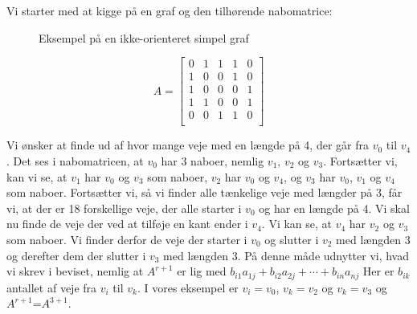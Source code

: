 \begin{exmp}
Vi starter med at kigge på en graf og den tilhørende nabomatrice:
\begin{figure}[H]
\centering
	\caption{Eksempel på en ikke-orienteret simpel graf}
	\label{fig.vaegtetopg}
\end{figure}


\begin{equation}
A=\begin{bmatrix}
    0&1&1&1&0\\
    1&0&0&1&0\\
    1&0&0&0&1\\
    1&1&0&0&1\\
    0&0&1&1&0\\
\end{bmatrix}
\end{equation}


Vi ønsker at finde ud af hvor mange veje med en længde på 4, der går fra $v_0$ til $v_4$. Det ses i nabomatricen, at $v_0$ har 3 naboer, nemlig $v_1$, $v_2$ og $v_3$. Fortsætter vi, kan vi se, at $v_1$ har $v_0$ og $v_3$ som naboer, $v_2$ har $v_0$ og $v_4$, og $v_3$ har $v_0$, $v_1$ og $v_4$ som naboer. Fortsætter vi, så vi finder alle tænkelige veje med længder på 3, får vi, at der er 18 forskellige veje, der alle starter i $v_0$ og har en længde på 4. Vi skal nu finde de veje der ved at tilføje en kant ender i $v_4$. Vi kan se, at $v_4$ har $v_2$ og $v_3$ som naboer. Vi finder derfor de veje der starter i $v_0$ og slutter i $v_2$ med længden 3 og derefter dem der slutter i $v_3$ med længden 3. På denne måde udnytter vi, hvad vi skrev i beviset, nemlig at
\textbf{$A^{r+1}$} er lig med $b_{i1}a_{1j} + b_{i2}a_{2j} +\cdots+ b_{in}a_{nj}$
Her er $b_{ik}$ antallet af veje fra $v_{i}$ til ${v_k}$. I vores eksempel er $v_{i}=v_{0}$, ${v_k}=v_{2}$ og ${v_k}=v_{3}$ og \textbf{$A^{r+1}$}=\textbf{$A^{3+1}$}. 
 

\end{exmp}
